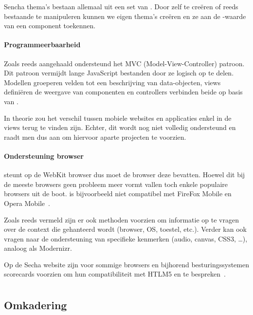 Sencha thema's bestaan allemaal uit een set van .  
Door zelf  te creëren of reeds bestaande te manipuleren kunnen we eigen thema's creëren en ze aan de -waarde van een component toekennen.

\paragraph{Programmeerbaarheid}
\label{sec:sencha-programeerbaarheid}
Zoals reeds aangehaald ondersteund \st{} het MVC (Model-View-Controller) patroon.  
Dit patroon vermijdt lange JavaScript bestanden door ze logisch op te delen.  
Modellen groeperen velden tot een beschrijving van data-objecten,  views definiëren de weergave van componenten en controllers verbinden beide op basis van .

In theorie zou het verschil tussen mobiele websites en applicaties enkel in de views terug te vinden zijn.  
Echter,  dit wordt nog niet volledig ondersteund en raadt men dus aan om hiervoor aparte projecten te voorzien.

\paragraph{Ondersteuning browser}
\st{} steunt op de WebKit browser  dus moet de browser deze bevatten.  
Hoewel dit bij de meeste browsers geen probleem meer vormt vallen toch enkele populaire browsers uit de boot.  
\st{} is bijvoorbeeld niet compatibel met FireFox Mobile en Opera Mobile~\cite{JohnEClark2012}.

Zoals reeds vermeld zijn er ook methoden voorzien om informatie op te vragen over de context die gehanteerd wordt (browser, OS, toestel, etc.).  Verder kan \st{} ook vragen naar de ondersteuning van specifieke kenmerken (audio,  canvas,  CSS3, …),  analoog als Modernizr.  

Op de Secha website zijn voor sommige browsers en bijhorend besturingssystemen scorecards voorzien om hun compatibiliteit met HTLM5 en \st{} te bespreken~\cite{Inc.}.


\section{\kendo}
\label{sec:raamwerk-kendo}

\subsection{Omkadering}
